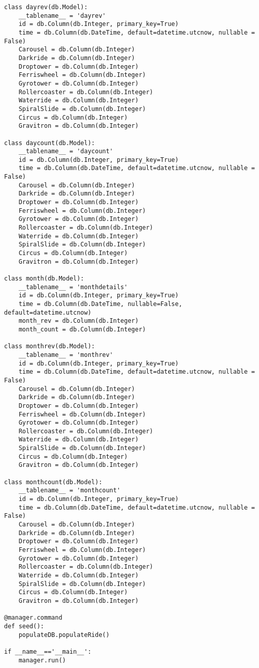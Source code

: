 \begin{verbatim}
class dayrev(db.Model):
    __tablename__ = 'dayrev'
    id = db.Column(db.Integer, primary_key=True)
    time = db.Column(db.DateTime, default=datetime.utcnow, nullable = False)
    Carousel = db.Column(db.Integer)
    Darkride = db.Column(db.Integer)
    Droptower = db.Column(db.Integer)
    Ferriswheel = db.Column(db.Integer)
    Gyrotower = db.Column(db.Integer)
    Rollercoaster = db.Column(db.Integer)
    Waterride = db.Column(db.Integer)
    SpiralSlide = db.Column(db.Integer)
    Circus = db.Column(db.Integer)
    Gravitron = db.Column(db.Integer)

class daycount(db.Model):
    __tablename__ = 'daycount'
    id = db.Column(db.Integer, primary_key=True)
    time = db.Column(db.DateTime, default=datetime.utcnow, nullable = False)
    Carousel = db.Column(db.Integer)
    Darkride = db.Column(db.Integer)
    Droptower = db.Column(db.Integer)
    Ferriswheel = db.Column(db.Integer)
    Gyrotower = db.Column(db.Integer)
    Rollercoaster = db.Column(db.Integer)
    Waterride = db.Column(db.Integer)
    SpiralSlide = db.Column(db.Integer)
    Circus = db.Column(db.Integer)
    Gravitron = db.Column(db.Integer)

class month(db.Model):
    __tablename__ = 'monthdetails'
    id = db.Column(db.Integer, primary_key=True)
    time = db.Column(db.DateTime, nullable=False, default=datetime.utcnow)
    month_rev = db.Column(db.Integer)
    month_count = db.Column(db.Integer)

class monthrev(db.Model):
    __tablename__ = 'monthrev'
    id = db.Column(db.Integer, primary_key=True)
    time = db.Column(db.DateTime, default=datetime.utcnow, nullable = False)
    Carousel = db.Column(db.Integer)
    Darkride = db.Column(db.Integer)
    Droptower = db.Column(db.Integer)
    Ferriswheel = db.Column(db.Integer)
    Gyrotower = db.Column(db.Integer)
    Rollercoaster = db.Column(db.Integer)
    Waterride = db.Column(db.Integer)
    SpiralSlide = db.Column(db.Integer)
    Circus = db.Column(db.Integer)
    Gravitron = db.Column(db.Integer)

class monthcount(db.Model):
    __tablename__ = 'monthcount'
    id = db.Column(db.Integer, primary_key=True)
    time = db.Column(db.DateTime, default=datetime.utcnow, nullable = False)
    Carousel = db.Column(db.Integer)
    Darkride = db.Column(db.Integer)
    Droptower = db.Column(db.Integer)
    Ferriswheel = db.Column(db.Integer)
    Gyrotower = db.Column(db.Integer)
    Rollercoaster = db.Column(db.Integer)
    Waterride = db.Column(db.Integer)
    SpiralSlide = db.Column(db.Integer)
    Circus = db.Column(db.Integer)
    Gravitron = db.Column(db.Integer)

@manager.command
def seed():
    populateDB.populateRide()

if __name__=='__main__':
    manager.run()
\end{verbatim}

